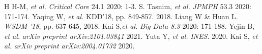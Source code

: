 {\footnotesize 
\begin{thebibliography}{99}
    \setlength{\parskip}{0cm}
    \setlength{\itemsep}{0cm}
     H H-M, \textit{et al.} \textit{Critical Care} 24.1 2020: 1-3.
     S. Tasnim, \textit{et al.} \textit{JPMPH} 53.3 2020: 171-174.
     Yaqing W, \textit{et al.} {KDD'18}, pp. 849-857. 2018.
     Liang W \& Huan L. \textit{WSDM '18},  pp. 637-645, 2018.
     Kai S,\textit{et al.} \textit{Big Data 8.3} 2020: 171-188.
     Yejin B, \textit{et al.} \textit{arXiv preprint arXiv:2101.03841} 2021.
     Yuta Y, \textit{et al.} \textit{INES}. 2020.
     Kai S, \textit{et al.}  \textit{arXiv preprint arXiv:2004.01732} 2020.
\end{thebibliography}
}


